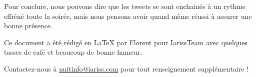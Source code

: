 \documentclass[12pt, a4paper]{article}
\newcommand{\espace}{\vspace{.8cm}}
\newcommand{\authors}{Florent}
\begin{document}
Pour conclure, nous pouvons dire que les tweets se sont enchainés à un rythme effréné toute la soirée, mais nous pensons avoir quand même réussi à assurer une bonne présence.



\espace\vfill{}
Ce document a été rédigé en \LaTeX{} par \authors{} pour IarissTeam avec quelques tasses de café et beaucoup de bonne humeur.

Contactez-nous à \href{mailto:nuitinfo@iariss.com}{nuitinfo@iariss.com} pour tout renseignement supplémentaire !
\end{document}
